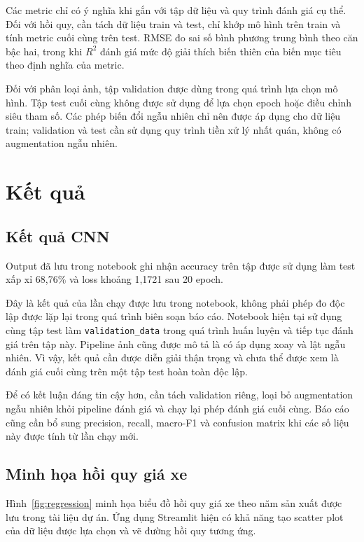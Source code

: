 \documentclass[runningheads]{llncs}
\begin{document}
Các metric chỉ có ý nghĩa khi gắn với tập dữ liệu và
quy trình đánh giá cụ thể. Đối với hồi quy, cần tách
dữ liệu train và test, chỉ khớp mô hình trên train và
tính metric cuối cùng trên test. RMSE đo sai số bình
phương trung bình theo căn bậc hai, trong khi $R^2$
đánh giá mức độ giải thích biến thiên của biến mục tiêu
theo định nghĩa của metric.

Đối với phân loại ảnh, tập validation được dùng trong
quá trình lựa chọn mô hình. Tập test cuối cùng không
được sử dụng để lựa chọn epoch hoặc điều chỉnh siêu
tham số. Các phép biến đổi ngẫu nhiên chỉ nên được áp
dụng cho dữ liệu train; validation và test cần sử dụng
quy trình tiền xử lý nhất quán, không có augmentation
ngẫu nhiên.

\section{Kết quả}

\subsection{Kết quả CNN}

Output đã lưu trong notebook ghi nhận accuracy trên tập
được sử dụng làm test xấp xỉ 68,76\% và loss khoảng
1,1721 sau 20 epoch.

Đây là kết quả của lần chạy được lưu trong notebook,
không phải phép đo độc lập được lặp lại trong quá trình
biên soạn báo cáo. Notebook hiện tại sử dụng cùng tập
test làm \texttt{validation\_data} trong quá trình huấn
luyện và tiếp tục đánh giá trên tập này. Pipeline ảnh
cũng được mô tả là có áp dụng xoay và lật ngẫu nhiên.
Vì vậy, kết quả cần được diễn giải thận trọng và chưa
thể được xem là đánh giá cuối cùng trên một tập test
hoàn toàn độc lập.

Để có kết luận đáng tin cậy hơn, cần tách validation
riêng, loại bỏ augmentation ngẫu nhiên khỏi pipeline
đánh giá và chạy lại phép đánh giá cuối cùng. Báo cáo
cũng cần bổ sung precision, recall, macro-F1 và confusion
matrix khi các số liệu này được tính từ lần chạy mới.

\subsection{Minh họa hồi quy giá xe}

Hình~\ref{fig:regression} minh họa biểu đồ hồi quy giá
xe theo năm sản xuất được lưu trong tài liệu dự án.
Ứng dụng Streamlit hiện có khả năng tạo scatter plot
của dữ liệu được lựa chọn và vẽ đường hồi quy tương ứng.
\end{document}
